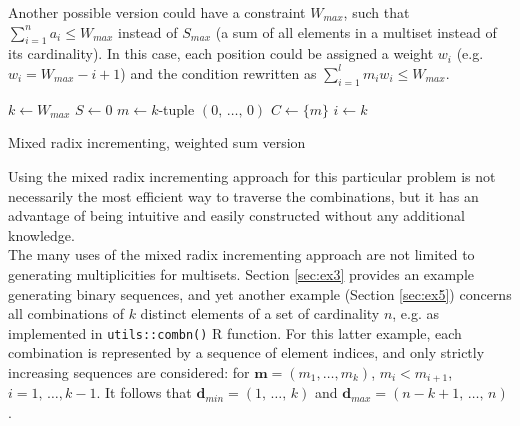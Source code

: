\documentclass[11pt]{article}
\begin{document}
Another possible version could have a constraint $W_{max}$, such that $\sum_{i = 1}^n a_i \leqslant W_{max}$ instead of $S_{max}$ (a sum of all elements in a multiset instead of its cardinality). In this case, each position could be assigned a weight $w_i$ (e.g. $w_i = W_{max} - i + 1$) and the condition rewritten as $\sum_{i = 1}^l m_i w_i \leqslant W_{max}$. \\

\begin{algorithm}[H]  \label{alg:mirsaW}
  
  \BlankLine
  $k \gets W_{max}$\;
  $S \gets 0$\;
  $m \gets k$-tuple $(0, \, \dotsc, \, 0)$\;  
  $C \gets \{m\}$\;
  $i \gets k$\;
  \caption{Mixed radix incrementing, weighted sum version}
\end{algorithm}  

\vspace{5mm}
Using the mixed radix incrementing approach for this particular problem is not necessarily the most efficient way to traverse the combinations, but it has an advantage of being intuitive and easily constructed without any additional knowledge. \\

The many uses of the mixed radix incrementing approach are not limited to generating multiplicities for multisets. Section \ref{sec:ex3} provides an example generating binary sequences, and yet another example (Section \ref{sec:ex5}) concerns all combinations of $k$ distinct elements of a set of cardinality $n$, e.g. as implemented in \texttt{utils::combn()} R function. For this latter example, each combination is represented by a sequence of element indices, and only strictly increasing sequences are considered: for $\boldsymbol{m} = (m_1, \dotsc, m_k)$, $m_i < m_{i + 1}$, $i = 1, \, \dotsc, k - 1$. It follows that $\boldsymbol{d}_{min} = (1, \, \dotsc, \, k)$ and $\boldsymbol{d}_{max} = (n - k + 1, \, \dotsc, \, n)$. \\
\end{document}
